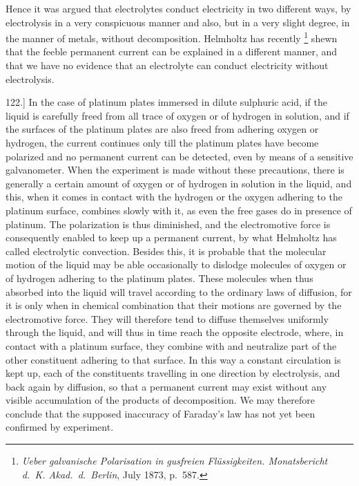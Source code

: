 \documentclass[12pt,oneside]{book}[2021/10/04]
\let\oldfootnote\footnote
\renewcommand\footnote[1]{%
\oldfootnote{\hspace{0.14em}#1}}
\newcommand{\Runhead}[1]{\fancyhead[C]{\iffloatpage{}{\small#1}}}
\newcommand{\article}[1]{\phantomsection \label{art:#1}{#1.]}}
\newcommand{\¬}{\hphantom{0}}
\begin{document}
Hence it was argued that electrolytes conduct electricity in two
different ways, by electrolysis in a very conspicuous manner and
also, but in a very slight degree, in the manner of metals, without
decomposition. Helmholtz has recently\footnote
{\textit{Ueber galvanische Polarisation in gusfreien Flüssigkeiten. Monatsbericht d.\ K.
Akad.\ d.\ Berlin}, July 1873, p.\ 587.} shewn that the feeble
permanent current can be explained in a different manner, and that
we have no evidence that an electrolyte can conduct electricity
without electrolysis.

\article{122} In the case of platinum plates immersed in dilute sulphuric
acid, if the liquid is carefully freed from all trace of oxygen or
of hydrogen in solution, and if the surfaces of the platinum plates
are also freed from adhering oxygen or hydrogen, the current continues
only till the platinum plates have become polarized and no
permanent current can be detected, even by means of a sensitive
galvanometer. When the experiment is made without these precautions,
there is generally a certain amount of oxygen or of hydrogen
in solution in the liquid, and this, when it comes in contact with
the hydrogen or the oxygen adhering to the platinum surface,
combines slowly with it, as even the free gases do in presence
of platinum. The polarization is thus diminished, and the electromotive
force is consequently enabled to keep up a permanent
current, by what Helmholtz has called electrolytic convection.
Besides this, it is probable that the molecular motion of the liquid
may be able occasionally to dislodge molecules of oxygen or of
hydrogen adhering to the platinum plates. These molecules when
thus absorbed into the liquid will travel according to the ordinary
laws of diffusion, for it is only when in chemical combination that
their motions are governed by the electromotive force. They will
therefore tend to diffuse themselves uniformly through the liquid,
and will thus in time reach the opposite electrode, where, in contact
with a platinum surface, they combine with and neutralize part of
the other constituent adhering to that surface. In this way a
constant circulation is kept up, each of the constituents travelling
in one direction by electrolysis, and back again by diffusion, so that
a permanent current may exist without any visible accumulation
of the products of decomposition. We may therefore conclude that
the supposed inaccuracy of Faraday's law has not yet been confirmed
by experiment.
\Runhead{ELECTROLYTIC CONVECTION.}
\end{document}
